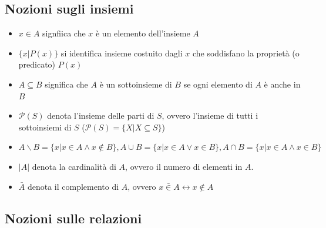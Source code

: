 \documentclass[a4paper]{article}
\begin{document}
\subsection{Nozioni sugli insiemi}

\begin{itemize}
    \item $x \in A$ signfiica che $x$ è un elemento dell'insieme $A$
    \item $\{x | P(x)\}$ si identifica insieme costuito dagli $x$ che soddisfano la proprietà (o predicato) $P(x)$
    \item $A \subseteq B$ significa che $A$ è un sottoinsieme di $B$ se ogni elemento di $A$ è anche in $B$
    \item $\mathcal{P}(S)$ denota l'insieme delle parti di $S$, ovvero l'insieme di tutti i sottoinsiemi di $S$ ($\mathcal{P}(S) = \{X | X \subseteq S\}$)
    \item $A \backslash B = \{x | x \in A \land x \notin B\}, A \cup B = \{x | x \in A \lor x \in B\}, A \cap B = \{x | x \in A \land x \in B\}$   
    \item $|A|$ denota la cardinalità di $A$, ovvero il numero di elementi in $A$.
    \item $\bar{A}$ denota il complemento di $A$, ovvero $x \bar{\in} A \leftrightarrow x \notin A$
\end{itemize}

\subsection{Nozioni sulle relazioni}
\end{document}

